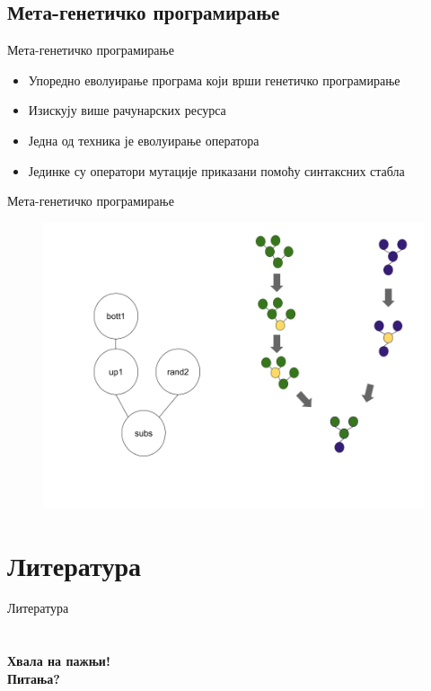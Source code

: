 \documentclass{beamer}
\begin{document}
\subsection[Мета-генетичко програмирање]{Мета-генетичко програмирање}

    \begin{frame}{Мета-генетичко програмирање}
        \begin{itemize}
            \item Упоредно еволуирање програма који врши генетичко програмирање
            \item Изискују више рачунарских ресурса
            \item Једна од техника је еволуирање оператора
            \item Јединке су оператори мутације приказани помоћу синтаксних стабла
        \end{itemize}
    \end{frame}
    
    \begin{frame}{Мета-генетичко програмирање}
		\begin{figure}
			\includegraphics[scale=0.3]{mgp_primer.png}
		\end{figure}

    \end{frame}
    
\appendix

\section{Литература}
    \begin{frame}{Литература}
        \nocite{*}
        \printbibliography
    \end{frame}


\section{}
\begin{frame}{}
    \centering
    \Huge\bfseries{Хвала на пажњи!\\ Питања?}
\end{frame}
\end{document}

